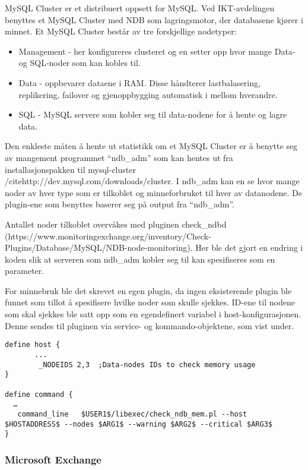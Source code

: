 MySQL Cluster er et distribuert oppsett for MySQL. Ved IKT-avdelingen benyttes et MySQL Cluster med NDB som lagringsmotor, der databasene kjører i minnet. Et MySQL Cluster består av tre forskjellige nodetyper:

\begin{itemize}
	\item Management - her konfigureres clusteret og en setter opp hvor mange Data- og SQL-noder som kan kobles til.
	\item Data - oppbevarer dataene i RAM. Disse håndterer lastbalasering, replikering, failover og gjenoppbygging automatisk i mellom hverandre.
	\item SQL - MySQL servere som kobler seg til data-nodene for å hente og lagre data.
\end{itemize}

Den enkleste måten å hente ut statistikk om et MySQL Cluster er å benytte seg av mangement programmet “ndb\_adm” som kan hentes ut fra installasjonspakken til mysql-cluster /cite{http://dev.mysql.com/downloads/cluster}. I ndb\_adm kan en se hvor mange noder av hver type som er tilkoblet og minneforbruket til hver av datanodene. De plugin-ene som benyttes baserer seg på output fra “ndb\_adm”.

Antallet noder tilkoblet overvåkes med pluginen check\_ndbd (https://www.monitoringexchange.org/inventory/Check-Plugins/Database/MySQL/NDB-node-monitoring). Her ble det gjort en endring i koden slik at serveren som ndb\_adm kobler seg til kan spesifiseres som en parameter.

For minnebruk ble det skrevet en egen plugin, da ingen eksisterende plugin ble funnet som tillot å spesifisere hvilke noder som skulle sjekkes. ID-ene til nodene som skal sjekkes ble satt opp som en egendefinert variabel i host-konfigurasjonen. Denne sendes til pluginen via service- og kommando-objektene, som vist under.

\begin{lstlisting}
define host {
       ...
        _NODEIDS 2,3  ;Data-nodes IDs to check memory usage
}

define command {
  …
   command_line   $USER1$/libexec/check_ndb_mem.pl --host $HOSTADDRESS$ --nodes $ARG1$ --warning $ARG2$ --critical $ARG3$
}
\end{lstlisting}
\subsubsection{Microsoft Exchange}

